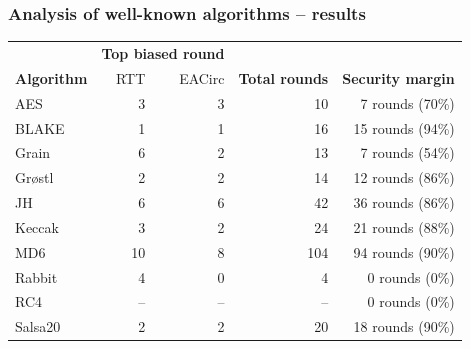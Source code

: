 \documentclass[aspectratio=169]{beamer}
\newcommand{\gr}{\cellcolor{green!40}}
\newcommand{\rd}{\cellcolor{red!40}}
\begin{document}
\begin{frame}
\frametitle{Analysis of well-known algorithms -- results}

\begin{table}
\begin{nomar}
\centering
\scalebox{0.75} {
\begin{tabular}{@{}lrrrr@{}}
                                                                                                                           \toprule
                   & \multicolumn{2}{c}{\textbf{Top biased round}} &                                                    \\ \cmidrule(lr){2-3}                       
\textbf{Algorithm} & RTT                & EACirc                   & \textbf{Total rounds} & \textbf{Security margin}   \\ \midrule
AES                &    3               & 3                        & 10                    &     7 rounds (70\%)        \\
BLAKE              &    1               & 1                        & 16                    &    15 rounds (94\%)        \\
Grain              & \gr6               & 2                        & 13                    &     7 rounds (54\%)        \\
Gr\o stl           &    2               & 2                        & 14                    &    12 rounds (86\%)        \\
JH                 &    6               & 6                        & 42                    &    36 rounds (86\%)        \\
Keccak             & \gr3               & 2                        & 24                    &    21 rounds (88\%)        \\
MD6                & \gr10              & 8                        & 104                   &    94 rounds (90\%)        \\
Rabbit             & \gr4               & 0                        & 4                     & \rd 0 rounds (0\%)         \\
RC4                & \gr--              & --                       & --                    & \rd 0 rounds (0\%)         \\
Salsa20            &    2               & 2                        & 20                    &    18 rounds (90\%)        \\

\end{tabular}}
\end{nomar}
\end{table}
\end{frame}
\end{document}
